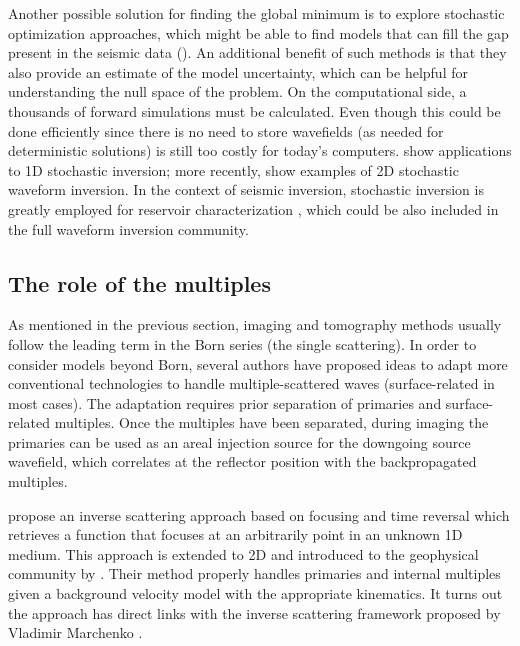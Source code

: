Another possible solution for finding the global minimum is to explore 
stochastic optimization approaches, which might be able to  
 find models that can fill the gap present in the seismic data (). An additional benefit
of such methods is that they also provide an estimate of the model uncertainty,
which can be helpful for understanding
the null space of the problem. On the computational side, a thousands of forward simulations
must be calculated. Even though this could be done efficiently since 
there is no need to store wavefields (as needed for deterministic 
solutions) is still too costly for today's computers. \cite{Sen91} show applications to 
1D stochastic inversion; more recently, \cite{stochasticPisa,SenWorkshop} show examples
of 2D stochastic waveform inversion. In the context of seismic inversion, stochastic inversion
is greatly employed for reservoir characterization \citep{boschReview}, which could 
be also included in the full waveform inversion community. 

\subsection{The role of the multiples}
As mentioned in the previous section, imaging and tomography methods usually follow
the leading term in the Born series (the single scattering). In order
to consider models beyond Born, 
several authors \citep{GuittonAreal,grion2007mirror,VerschuurMultiples,DanWhitmore,Mandy} have 
proposed ideas to adapt more conventional technologies 
to handle multiple-scattered waves (surface-related in most cases).
 The adaptation requires prior separation of primaries and surface-related multiples. 
Once the multiples have been separated, during imaging the primaries can be 
used as an areal injection source for the downgoing source wavefield, which 
correlates at the reflector position with the backpropagated multiples.

\cite{rose2002,rose2002single} propose an inverse scattering approach based
on focusing and time reversal which retrieves a function  that focuses at 
an arbitrarily point in an 
unknown 1D medium. This approach is extended to 2D and introduced to 
the geophysical community by \cite{Fil2012}. Their method properly handles
primaries and internal multiples given a background velocity model with the 
appropriate kinematics. It turns out the approach has direct links with 
the inverse scattering framework proposed by Vladimir Marchenko \citep{marchenko2011sturm}. 

